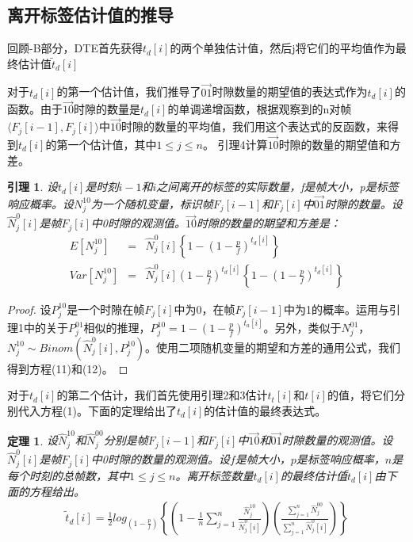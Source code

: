 \documentclass[UTF8]{ctexart}
\newcommand{\RNum}[1]{\uppercase\expandafter{\romannumeral #1\relax}}
\newtheorem{theorem}{定理}
\newtheorem{lemma}{引理}
\newtheorem*{proof}{证明}
\begin{document}
\subsection{离开标签估计值的推导}
回顾\RNum{2}-B部分，DTE首先获得$t_d[i]$的两个单独估计值，然后j将它们的平均值作为最终估计值$\widetilde{t}_d[i]$

对于$t_d[i]$的第一个估计值，我们推导了$\overrightarrow{01}$时隙数量的期望值的表达式作为$t_d[i]$的函数。由于$\overrightarrow{10}$时隙的数量是$t_d[i]$的单调递增函数，根据观察到的n对帧$\langle F_j[i-1],F_j[i]\rangle$中$\overrightarrow{10}$时隙的数量的平均值，我们用这个表达式的反函数，来得到$t_d[i]$的第一个估计值，其中$1\leq j\leq n$。 引理4计算$\overrightarrow{10}$时隙的数量的期望值和方差。

\begin{lemma}
设$t_d[i]$是时刻$i-1$和$i$之间离开的标签的实际数量，f是帧大小，p是标签响应概率。设$N^{10}_j$为一个随机变量，标识帧$F_j[i-1]$和$F_j[i]$中$\overrightarrow{01}$时隙的数量。设$\hat{N}^0_j[i]$是帧$F_j[i]$中0时隙的观测值。$\overrightarrow{10}$时隙的数量的期望和方差是：
\begin{eqnarray}
E[N^10_j]&=&\hat{N}^0_j[i]\left\{1-\left(1-\frac{p}{f}\right)^{t_d[i]}\right\}\\
Var[N^{10}_j]&=&\hat{N}^0_j[i]\left(1-\frac{p}{f}\right)^{t_d[i]}\left\{1-\left(1-\frac{p}{f}\right)^{t_d[i]}\right\}
\end{eqnarray}
\end{lemma}

\begin{proof}
设$P^{10}_j$是一个时隙在帧$F_j[i]$中为0，在帧$F_j[i-1]$中为1的概率。运用与引理1中的关于$P^{01}_j$相似的推理，$P^{10}_j=1-\left(1-\frac{p}{f}\right)^{t_a[i]}$。另外，类似于$N^{01}_j$，$N^{10}_j\sim Binom(\hat{N}^0_j[i],P^{10}_j)$。使用二项随机变量的期望和方差的通用公式，我们得到方程(11)和(12)。
\end{proof}

对于$t_d[i]$的第二个估计，我们首先使用引理2和3估计$t_t[i]$和$t[i]$的值，将它们分别代入方程(1)。下面的定理给出了$t_d[i]$的估计值的最终表达式。

\begin{theorem}
设$\hat{N}^{10}_j$和$\hat{N}^{00}_j$分别是帧$F_j[i-1]$和$F_j[i]$中$\overrightarrow{10}$和$\overrightarrow{01}$时隙数量的观测值。设$\hat{N}^0_j[i]$是帧$F_j[i]$中0时隙的数量的观测值。设$f$是帧大小，$p$是标签响应概率，$n$是每个时刻的总帧数，其中$1\leq j\leq n$。离开标签数量$t_d[i]$的最终估计值$\widetilde{t}_d[i]$由下面的方程给出。
\begin{eqnarray*}
\widetilde{t}_d[i]=\frac{1}{2}log_{\left(1-\frac{p}{f}\right)}\left\{\left(1-\frac{1}{n}\sum_{j=1}^{n}\frac{\hat{N}^{10}_j}{\hat{N}^0_j[i]}\right)\left(\frac{\sum_{j=1}^{n}\hat{N}^{00}_j}{\sum_{j=1}^{n}\hat{N}^0_j[i]}\right)\right\}
\end{eqnarray*}
\end{theorem}
\end{document}
